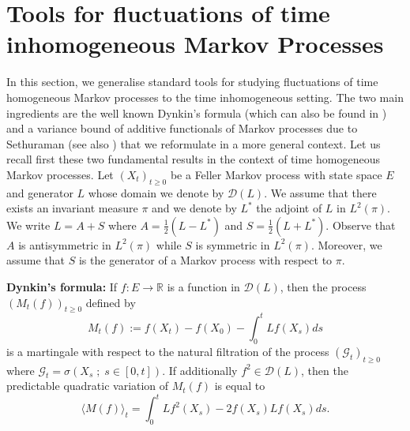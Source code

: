 \documentclass[a4paper, reqno, 12pt]{amsart}
\theoremstyle{plain}
\theoremstyle{definition}
\newcommand{\leander}[1]{\textcolor{red}{(L: #1)}}
\begin{document}
\section{Tools for fluctuations of time inhomogeneous Markov Processes} \label{sec:inhomogenoustools}
In this section, we generalise standard tools  for studying fluctuations of time homogeneous Markov processes to the time inhomogeneous setting. 
The two main ingredients are the well known Dynkin's formula (which can also be found in \cite{EK86}) and a variance bound of additive functionals of Markov processes due to Sethuraman \cite{S00} (see also \cite{CLO01})
that we reformulate in a more general context. Let us recall first these two fundamental results in the context of time homogeneous Markov processes.  Let $(X_t)_{t\ge 0}$ be  a Feller Markov process with state space $E$ and generator $L$ whose domain we denote by $\mathcal D(L)$.  We assume that there exists an invariant measure $\pi$ and we denote by $L^*$ the adjoint of $L$ in $L^2(\pi)$. We write $L=A+S$ where $A=\tfrac{1}{2} (L-L^*)$ and $S=\tfrac{1}{2}(L+L^*)$. Observe that $A$ is antisymmetric in $L^2 (\pi)$ while $S$ is symmetric in $L^2 (\pi)$. Moreover, we assume that  $S$ is the generator of a Markov process with respect to $\pi$.  

\bigskip

\textbf{Dynkin's formula:} If $f: E\to\mathbb R$ is a function in  $\mathcal D(L)$, then the process $(M_t(f))_{t \ge 0}$ defined by 
\begin{equation} 
\label{eq:dynkin1}
    M_t(f) := f(X_t) - f(X_0) - \int_0^t   Lf(X_s) ds
\end{equation}
is a martingale with respect to the natural filtration of the process $(\mathcal G_t)_{t\ge 0}$ where $\mathcal G_t=\sigma(X_s\; ; \;  s\in[0,t])$. If additionally $f^2\in \mathcal D(L)$, then the predictable quadratic variation of $M_t(f)$ is equal to 
\begin{equation} \label{eq:dynkin2} 
    \langle M(f)\rangle_t= \int_0^t L f^2(X_s) - 2 f(X_s)Lf(X_s) ds.
\end{equation}

\bigskip
\end{document}
